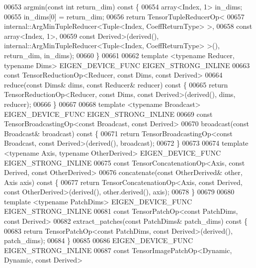 \begin{DoxyCode}
00653     argmin(\textcolor{keyword}{const} \textcolor{keywordtype}{int} return\_dim)\textcolor{keyword}{ const }\{
00654       array<Index, 1> in\_dims;
00655       in\_dims[0] = return\_dim;
00656       \textcolor{keywordflow}{return} TensorTupleReducerOp<
00657         internal::ArgMinTupleReducer<Tuple<Index, CoeffReturnType> >,
00658         \textcolor{keyword}{const} array<Index, 1>,
00659         \textcolor{keyword}{const} Derived>(derived(), internal::ArgMinTupleReducer<Tuple<Index, CoeffReturnType> >(), 
      return\_dim, in\_dims);
00660     \}
00661 
00662     \textcolor{keyword}{template} <\textcolor{keyword}{typename} Reducer, \textcolor{keyword}{typename} Dims> EIGEN\_DEVICE\_FUNC EIGEN\_STRONG\_INLINE
00663     \textcolor{keyword}{const} TensorReductionOp<Reducer, const Dims, const Derived>
00664     reduce(\textcolor{keyword}{const} Dims& dims, \textcolor{keyword}{const} Reducer& reducer)\textcolor{keyword}{ const }\{
00665       \textcolor{keywordflow}{return} TensorReductionOp<Reducer, const Dims, const Derived>(derived(), dims, reducer);
00666     \}
00667 
00668     \textcolor{keyword}{template} <\textcolor{keyword}{typename} Broadcast> EIGEN\_DEVICE\_FUNC EIGEN\_STRONG\_INLINE
00669     \textcolor{keyword}{const} TensorBroadcastingOp<const Broadcast, const Derived>
00670     broadcast(\textcolor{keyword}{const} Broadcast& broadcast)\textcolor{keyword}{ const }\{
00671       \textcolor{keywordflow}{return} TensorBroadcastingOp<const Broadcast, const Derived>(derived(), broadcast);
00672     \}
00673 
00674     \textcolor{keyword}{template} <\textcolor{keyword}{typename} Axis, \textcolor{keyword}{typename} OtherDerived> EIGEN\_DEVICE\_FUNC EIGEN\_STRONG\_INLINE
00675     \textcolor{keyword}{const} TensorConcatenationOp<Axis, const Derived, const OtherDerived>
00676     concatenate(\textcolor{keyword}{const} OtherDerived& other, Axis axis)\textcolor{keyword}{ const }\{
00677       \textcolor{keywordflow}{return} TensorConcatenationOp<Axis, const Derived, const OtherDerived>(derived(), other.derived(), 
      axis);
00678     \}
00679 
00680     \textcolor{keyword}{template} <\textcolor{keyword}{typename} PatchDims> EIGEN\_DEVICE\_FUNC EIGEN\_STRONG\_INLINE
00681     \textcolor{keyword}{const} TensorPatchOp<const PatchDims, const Derived>
00682     extract\_patches(\textcolor{keyword}{const} PatchDims& patch\_dims)\textcolor{keyword}{ const }\{
00683       \textcolor{keywordflow}{return} TensorPatchOp<const PatchDims, const Derived>(derived(), patch\_dims);
00684     \}
00685 
00686     EIGEN\_DEVICE\_FUNC EIGEN\_STRONG\_INLINE
00687     \textcolor{keyword}{const} TensorImagePatchOp<Dynamic, Dynamic, const Derived>

\end{DoxyCode}
